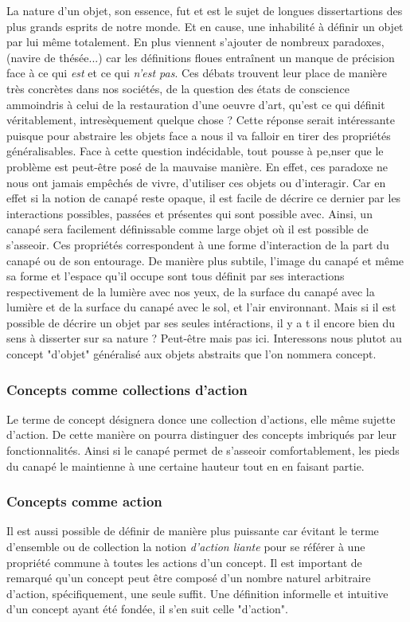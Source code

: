 \documentclass[10pt,b5paper, french]{book}
\begin{document}
La nature d'un objet, son essence, fut et est le sujet de longues dissertartions des plus grands esprits de notre monde. Et en cause, une inhabilité à définir un objet par lui même totalement. En plus viennent s'ajouter de nombreux paradoxes, (navire de thésée...) car les définitions floues entraînent un manque de précision face à ce qui \textit{est} et ce qui \textit{n'est pas}. Ces débats trouvent leur place de manière très concrètes dans nos sociétés, de la question des états de conscience ammoindris à celui de la restauration d'une oeuvre d'art, qu'est ce qui définit véritablement, intresèquement quelque chose ? Cette réponse serait intéressante puisque pour abstraire les objets face a nous il va falloir en tirer des propriétés généralisables. Face à cette question indécidable, tout pousse à pe,nser que le problème est peut-être posé de la mauvaise manière. En effet, ces paradoxe ne nous ont jamais empêchés de vivre, d'utiliser ces objets ou d'interagir. Car en effet si la notion de canapé reste opaque, il est facile de décrire ce dernier par les interactions possibles, passées et présentes qui sont possible avec. Ainsi, un canapé sera facilement définissable comme large objet où il est possible de s'asseoir. Ces propriétés correspondent à une forme d'interaction de la part du canapé ou de son entourage. De manière plus subtile, l'image du canapé et même sa forme et l'espace qu'il occupe sont tous définit par ses interactions respectivement de la lumière avec nos yeux, de la surface du canapé avec la lumière et de la surface du canapé avec le sol, et l'air environnant. Mais si il est possible de décrire un objet par ses seules intéractions, il y a t il encore bien du sens à disserter sur sa nature ? Peut-être mais pas ici. Interessons nous plutot au concept "d'objet" généralisé aux objets abstraits que l'on nommera concept.

\subsubsection{Concepts comme collections d'action}
Le terme de concept désignera donce une collection d'actions, elle même sujette d'action. De cette manière on pourra distinguer des concepts imbriqués par leur fonctionnalités. Ainsi si le canapé permet de s'asseoir comfortablement, les pieds du canapé le maintienne à une certaine hauteur tout en en faisant partie.

\subsubsection{Concepts comme action}
Il est aussi possible de définir de manière plus puissante car évitant le terme d'ensemble ou de collection la notion \textit{d'action liante} pour se référer à une propriété commune à toutes les actions d'un concept. Il est important de remarqué qu'un concept peut être composé d'un nombre naturel arbitraire d'action, spécifiquement, une seule suffit.
Une définition informelle et intuitive d'un concept ayant été fondée, il s'en suit celle "d'action".
\end{document}

